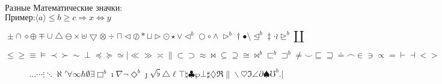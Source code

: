 \documentclass[11pt,a4paper,oneside]{article}
\renewcommand{\t}{\texttt}    %
\renewcommand{\le}{\leqslant}
\renewcommand{\ge}{\geqslant}
\def\SO{\Rightarrow}         %
\def\EQ{\Leftrightarrow}     %
\newcommand{\q}[1]{\langle #1 \rangle} %
\begin{document}
\begin{center}
Разные Математические значки: \\
$\t{Пример:} \q{a} \le b \ge c \SO x \EQ y$ 
\end{center}

$$
 \pm                  \cap                \diamond                    \oplus      
 \mp                  \cup                \bigtriangleup              \ominus     
 \times               \uplus              \bigtriangledown            \otimes     
 \div                 \sqcap              \triangleleft               \oslash     
 \ast                 \sqcup              \triangleright              \odot       
 \star                \vee                \lhd^b                    \bigcirc    
 \circ                \wedge              \rhd^b                    \dagger     
 \bullet              \setminus           \unlhd^b                  \ddagger    
 \cdot                \wr                 \unrhd^b                  \amalg      
$$

$$
 \leq                 \geq                \equiv              \models       
 \prec                \succ               \sim                \perp         
 \preceq              \succeq             \simeq              \mid          
 \ll                  \gg                 \asymp              \parallel     
 \subset              \supset             \approx             \bowtie       
 \subseteq            \supseteq           \cong               \Join^b
 \sqsubset^b        \sqsupset^b       \neq                \smile        
 \sqsubseteq          \sqsupseteq         \doteq              \frown        
 \in                  \ni                 \propto             =             
 \vdash               \dashv              <                   >             
$$

$$
 \ldots               \cdots              \vdots              \ddots        
 \aleph               \prime              \forall             \infty        
 \hbar                \emptyset           \exists             \Box^b      
 \imath               \nabla              \neg                \Diamond^b  
 \jmath               \surd               \flat               \triangle     
 \ell                 \top                \natural            \clubsuit     
 \wp                  \bot                \sharp              \diamondsuit  
 \Re                  \|                  \backslash          \heartsuit    
 \Im                  \angle              \partial            \spadesuit    
 \mho^b             .                   |
$$
\end{document}
